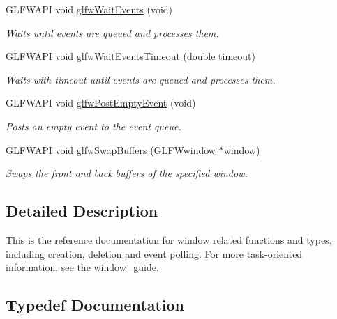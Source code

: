 \begin{DoxyCompactItemize}
G\+L\+F\+W\+A\+PI void \hyperlink{group__window_ga6e042d05823c11e11c7339b81a237738}{glfw\+Wait\+Events} (void)
\begin{DoxyCompactList}\small\item\em Waits until events are queued and processes them. \end{DoxyCompactList}\item 
G\+L\+F\+W\+A\+PI void \hyperlink{group__window_ga05223a0a4c5e50f10f289e60398153aa}{glfw\+Wait\+Events\+Timeout} (double timeout)
\begin{DoxyCompactList}\small\item\em Waits with timeout until events are queued and processes them. \end{DoxyCompactList}\item 
G\+L\+F\+W\+A\+PI void \hyperlink{group__window_gad6f6b997278c91c43b35970eb9713d7e}{glfw\+Post\+Empty\+Event} (void)
\begin{DoxyCompactList}\small\item\em Posts an empty event to the event queue. \end{DoxyCompactList}\item 
G\+L\+F\+W\+A\+PI void \hyperlink{group__window_gafb827800eedbfcbc97b1e5408df668d7}{glfw\+Swap\+Buffers} (\hyperlink{group__window_ga3c96d80d363e67d13a41b5d1821f3242}{G\+L\+F\+Wwindow} $\ast$window)
\begin{DoxyCompactList}\small\item\em Swaps the front and back buffers of the specified window. \end{DoxyCompactList}\end{DoxyCompactItemize}


\subsection{Detailed Description}
This is the reference documentation for window related functions and types, including creation, deletion and event polling. For more task-\/oriented information, see the window\+\_\+guide. 

\subsection{Typedef Documentation}
\mbox{\label{group__window_ga3e218ef9ff826129c55a7d5f6971a285}} 
